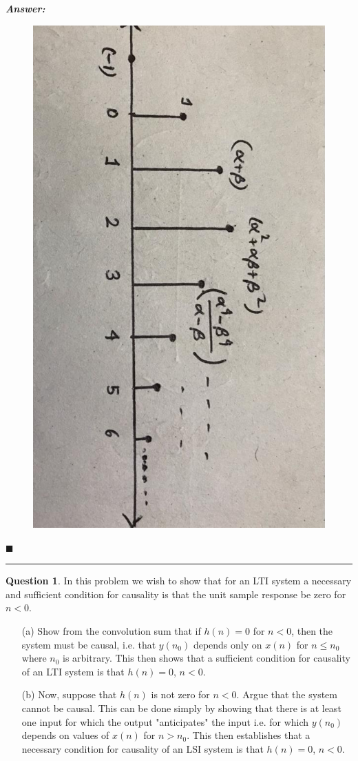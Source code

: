 \documentclass[12pt]{article}
\theoremstyle{definition}
\newtheorem{question}{Question}
\newenvironment{answer}{
    \textbf{\textit{Answer:}} \qquad
}{\hfill $\blacksquare$ \\ \begin{center}
    \rule{0.6\linewidth}{0.5px}    
\end{center}
}
\begin{document}
\begin{answer}
\begin{enumerate}
        \begin{figure}[H]
            \centering
            \includegraphics[height = 0.5\linewidth, angle = 90]{q7_c.jpeg}
        \end{figure}        
    \end{enumerate}
\end{answer}




\begin{question}
    In this problem we wish to show that for an LTI system a necessary and sufficient condition for causality is that the unit sample response be zero for $n < 0$.
    \begin{enumerate}
        \item[(a)] Show from the convolution sum that if $h(n) = 0$ for $n < 0$, then the system must be causal, i.e. that $y(n_0)$ depends only on $x(n)$ for $n \leq n_0$ where $n_0$ is arbitrary. This then shows that a sufficient condition for causality of an LTI system is that $h(n) = 0$, $n < 0$.
        \item[(b)] Now, suppose that $h(n)$ is not zero for $n < 0$. Argue that the system cannot be causal. This can be done simply by showing that there is at least one input for which the output "anticipates" the input i.e. for which $y(n_0)$ depends on values of $x(n)$ for $n > n_0$. This then establishes that a necessary condition for causality of an LSI system is that $h(n) = 0$, $n < 0$. 
    \end{enumerate} 
\end{question}
\end{document}
